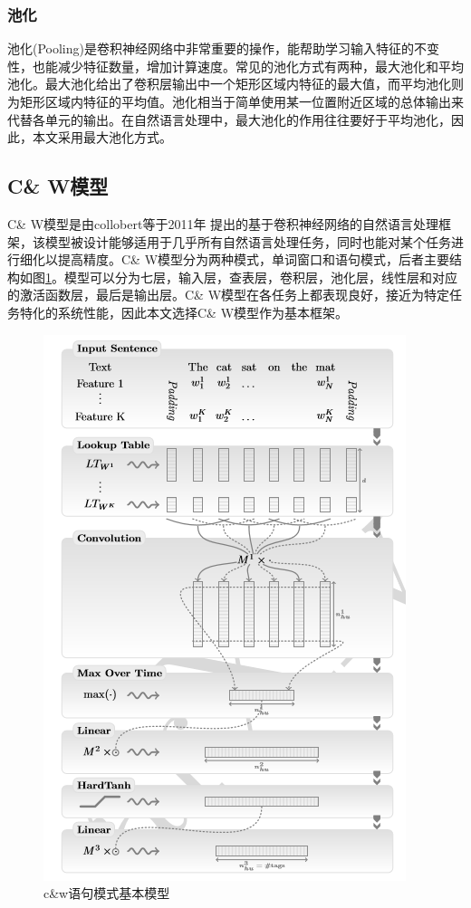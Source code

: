 \subsubsection{池化}
池化(Pooling)是卷积神经网络中非常重要的操作，能帮助学习输入特征的不变性，也能减少特征数量，增加计算速度。常见的池化方式有两种，最大池化和平均池化。最大池化给出了卷积层输出中一个矩形区域内特征的最大值，而平均池化则为矩形区域内特征的平均值。池化相当于简单使用某一位置附近区域的总体输出来代替各单元的输出。在自然语言处理中，最大池化的作用往往要好于平均池化，因此，本文采用最大池化方式。
\subsection{C\& W模型}
C\& W模型是由collobert等于2011年\cite{collobert2011} 提出的基于卷积神经网络的自然语言处理框架，该模型被设计能够适用于几乎所有自然语言处理任务，同时也能对某个任务进行细化以提高精度。C\& W模型分为两种模式，单词窗口和语句模式，后者主要结构如图\ref{candw1}。模型可以分为七层，输入层，查表层，卷积层，池化层，线性层和对应的激活函数层，最后是输出层。C\& W模型在各任务上都表现良好，接近为特定任务特化的系统性能，因此本文选择C\& W模型作为基本框架。
\begin{figure}
\begin{center}
\includegraphics{graphic/candw1.png}
\caption{c\&w语句模式基本模型 \label{candw1}}
\end{center}
\end{figure}

